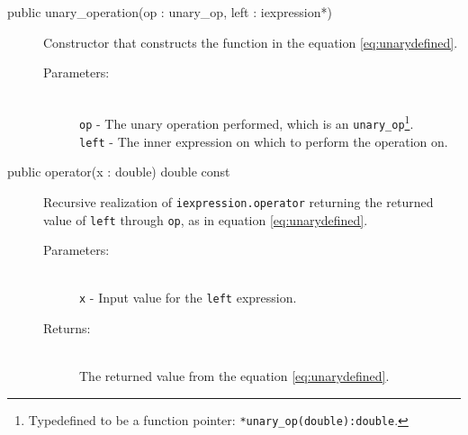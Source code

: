 \documentclass[a4paper,11pt]{kth-mag}
\begin{document}
\begin{description}
    \item[public unary\_operation(op : unary\_op, left : iexpression*)] Constructor 
    that constructs the function in the equation \ref{eq:unarydefined}. 
    \begin{description}
        \item[Parameters:]~\\
            \verb+op+ - The unary operation performed, which is an \texttt{unary\_op}\footnote{Typedefined to
            be a function pointer: \texttt{*unary\_op(double):double}.}.\\
            \verb+left+ - The inner expression on which to perform the
            operation on.
    \end{description}
\end{description}
\begin{description}
    \item[public operator(x : double) double const] 
    Recursive realization of \texttt{iexpression.operator} returning the
    returned value of \texttt{left} through \texttt{op}, as in equation
    \ref{eq:unarydefined}.
    \begin{description}
        \item[Parameters:]~\\
            \verb+x+ - Input value for the \texttt{left} expression.
        \item[Returns:]~\\
            The returned value from the equation \ref{eq:unarydefined}.
    \end{description}
\end{description}
\end{document}
